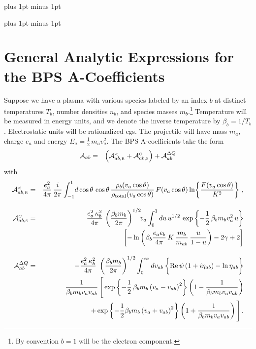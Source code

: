 \documentclass[preprint,12pt,eqsecnum,nofootinbib,amsmath,amssymb]{revtex4}
\newcommand{\smC}{{\rm\scriptscriptstyle C}}
\newcommand{\smR}{{\rm\scriptscriptstyle R}}
\newcommand{\smS}{{\rm\scriptscriptstyle S}}
\newcommand{\smLT}{{\rm\scriptscriptstyle <}}
\newcommand{\bodyskip}{\baselineskip 18pt plus 1pt minus 1pt}
\newcommand{\tableofcontentsskip}{\baselineskip 14pt plus 1pt minus 1pt}
\begin{document}

\pagebreak
\tableofcontentsskip
\tableofcontents

\newpage
\bodyskip

\pagebreak
\clearpage

\section{General Analytic Expressions for the BPS A-Coefficients}

Suppose we have a plasma with various species labeled by an index $b$
at distinct temperatures $T_b$, number densities $n_b$, and species
masses $m_b$.\footnote{By convention $b=1$ will be the electron
component.}  Temperature will be measured in energy units, and we
denote the inverse temperature by $\beta_b =1/T_b$. Electrostatic
units will be rationalized cgs. The projectile will have mass $m_a$,
charge $e_a$ and energy $E_a = \frac{1}{2}\, m_a v_a^2$.  The BPS
{\cal A}-coefficients take the form
\begin{eqnarray}
  {\cal A}_{ab} 
  &=&  
  \Big({\cal A}^\smLT_{ab,\smR}  + {\cal A}^\smC_{ab,\smS} \Big) +
  {\cal A}^{\Delta Q}_{ab} 
\label{all}
\end{eqnarray}
with
\begin{eqnarray}
  {\cal A}^\smLT_{ab,\smR}
  &=&
  \frac{e_a^2}{4 \pi}\, \frac{i}{2 \pi}
  \int_{-1}^1 \! d\cos\theta\, \cos\theta\,
  \frac{\rho_b(v_a\cos\theta)}
  {\rho_{\rm total}(v_a\cos\theta)}\,F(v_a \cos\theta) 
  \ln\!\left\{\frac{F(v_a\cos\theta)}{K^2}\right\} \,, 
\label{nun}
\\[10pt]
  {\cal A}^\smC_{ab,\smS}
  &=& 
  \frac{e_a^2\,\kappa^2_b}{4\pi} \,   
  \left( \frac{\beta_b m_b}{2\pi} \right)^{1/2}\!\!
  v_a\int_0^1 du \, u^{1/2} \,\exp\left\{ - \frac{1}{2} \,
  \beta_b m_b v^2_a \, u \right\}
\nonumber\\
  && \hskip4.0cm
  \left[ -\ln \left(\beta_b  \frac{e_a e_b}{4\pi} \,
  K \, \frac{m_b}{m_{ab}} \, \frac{u}{1-u} \right) 
  - 2 \gamma + 2 \right] 
\label{wonderclassic}
\\[10pt]
  {\cal A}^{\Delta Q}_{ab}
  &=&
  -\frac{e_a^2\, \kappa_b^2}{4 \pi}\
  \left( \frac{\beta_b m_b}{2\pi} \right)^{1/2} 
  \int_0^\infty dv_{ab} \,
  \bigg\{ {\rm Re} \, \psi \left( 1 + i \eta_{ab}
  \right) - \ln \eta_{ab}  \bigg\}
\nonumber\\
  &&
  \frac{1}{\beta_b m_b v_a v_{ab}} \, 
  \Bigg[ \exp\left\{ - \frac{1}{2}\, \beta_b
  m_b \left( v_a - v_{ab} \right)^2\right\} 
   \left( 1 - \frac{1}{\beta_b m_b v_a v_{ab} } \right) 
\nonumber\\
  && \qquad\qquad\quad
  + \exp\left\{ - \frac{1}{2} \beta_b m_b \left( v_a + v_{ab} 
  \right)^2\right\} 
   \left( 1 + \frac{1}{\beta_b m_b v_a v_{ab} } \right) 
\Bigg]	\,.
\label{regb}
\end{eqnarray}
\end{document}
